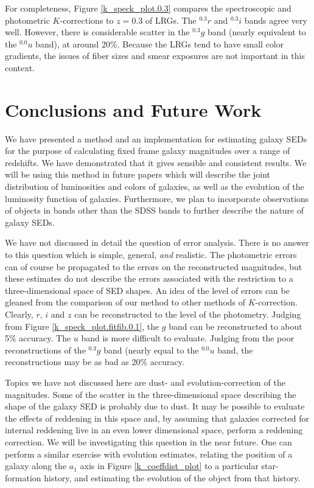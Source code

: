\documentclass[10pt,preprint]{aastex}
\newcommand{\band}[2]{\ensuremath{^{#1}\!{#2}}}
\begin{document}
For completeness, Figure \ref{k_speck_plot.0.3} compares the
spectroscopic and photometric $K$-corrections to $z=0.3$ of LRGs. The
\band{0.3}{r} and \band{0.3}{i} bands agree very well. However, there
is considerable scatter in the \band{0.3}{g} band (nearly equivalent
to the \band{0.0}{u} band), at around 20\%. Because the LRGs tend to
have small color gradients, the issues of fiber sizes and smear
exposures are not important in this context.

\section{Conclusions and Future Work}
\label{conclusions}

We have presented a method and an implementation for estimating galaxy
SEDs for the purpose of calculating fixed frame galaxy magnitudes over
a range of redshifts. We have demonstrated that it gives sensible and
consistent results. We will be using this method in future papers
which will describe the joint distribution of luminosities and colors
of galaxies, as well as the evolution of the luminosity function of
galaxies. Furthermore, we plan to incorporate observations of objects
in bands other than the SDSS bands to further describe the nature of
galaxy SEDs.

We have not discussed in detail the question of error analysis. There
is no answer to this question which is simple, general, {\it and}
realistic. The photometric errors can of course be propagated to the
errors on the reconstructed magnitudes, but these estimates do not
describe the errors associated with the restriction to a
three-dimensional space of SED shapes. An idea of the level of errors
can be gleaned from the comparison of our method to other methods of
$K$-correction. Clearly, $r$, $i$ and $z$ can be reconstructed to the
level of the photometry. Judging from Figure
\ref{k_speck_plot.fitfib.0.1}, the $g$ band can be reconstructed to
about 5\% accuracy. The $u$ band is more difficult to evaluate.
Judging from the poor reconstructions of the $\band{0.3}{g}$ band
(nearly equal to the $\band{0.0}{u}$ band, the reconstructions may be
as bad as 20\% accuracy.

Topics we have not discussed here are dust- and evolution-correction
of the magnitudes. Some of the scatter in the three-dimensional space
describing the shape of the galaxy SED is probably due to dust. It may
be possible to evaluate the effects of reddening in this space and, by
assuming that galaxies corrected for internal reddening live in an
even lower dimensional space, perform a reddening correction. We will
be investigating this question in the near future. One can perform a
similar exercise with evolution estimates, relating the position of a
galaxy along the $a_1$ axis in Figure \ref{k_coeffdist_plot} to a
particular star-formation history, and estimating the evolution of the
object from that history.
\end{document}
